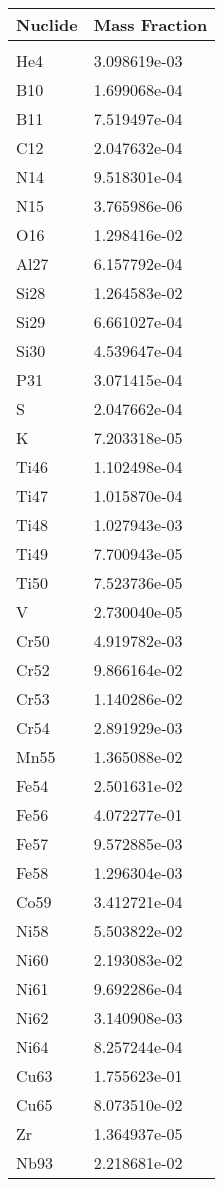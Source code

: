 \begin{centering}
\begin{longtable}[ht!]
{ p{} | p{} }
\hline
Nuclide & Mass Fraction\\
\hline
\\
He4 & 3.098619e-03\\
B10 & 1.699068e-04\\
B11 & 7.519497e-04\\
C12 & 2.047632e-04\\
N14 & 9.518301e-04\\
N15 & 3.765986e-06\\
O16 & 1.298416e-02\\
Al27 & 6.157792e-04\\
Si28 & 1.264583e-02\\
Si29 & 6.661027e-04\\
Si30 & 4.539647e-04\\
P31 & 3.071415e-04\\
S & 2.047662e-04\\
K & 7.203318e-05\\
Ti46 & 1.102498e-04\\
Ti47 & 1.015870e-04\\
Ti48 & 1.027943e-03\\
Ti49 & 7.700943e-05\\
Ti50 & 7.523736e-05\\
V & 2.730040e-05\\
Cr50 & 4.919782e-03\\
Cr52 & 9.866164e-02\\
Cr53 & 1.140286e-02\\
Cr54 & 2.891929e-03\\
Mn55 & 1.365088e-02\\
Fe54 & 2.501631e-02\\
Fe56 & 4.072277e-01\\
Fe57 & 9.572885e-03\\
Fe58 & 1.296304e-03\\
Co59 & 3.412721e-04\\
Ni58 & 5.503822e-02\\
Ni60 & 2.193083e-02\\
Ni61 & 9.692286e-04\\
Ni62 & 3.140908e-03\\
Ni64 & 8.257244e-04\\
Cu63 & 1.755623e-01\\
Cu65 & 8.073510e-02\\
Zr & 1.364937e-05\\
Nb93 & 2.218681e-02\\

\end{longtable}
\end{centering}

